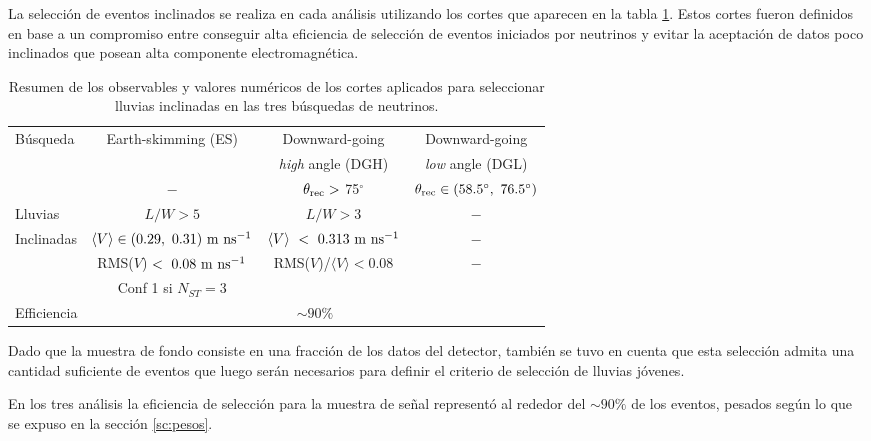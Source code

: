 		La selección de eventos inclinados se realiza en cada análisis utilizando los cortes que aparecen en la tabla \ref{tab:inclSel}.
		Estos cortes fueron definidos en base a un compromiso entre conseguir alta eficiencia de selección de eventos iniciados por neutrinos y evitar la aceptación de datos poco inclinados que posean alta componente electromagnética.
		\begin{table}[ht!]
		\begin{center}
			\renewcommand{\arraystretch}{1.4}
			\scriptsize
			\begin{tabular}{|l|c|c|c|}
			\hline
			Búsqueda & Earth-skimming (ES)           & Downward-going                        & Downward-going                       \\
					&                               & {\it high} angle (DGH)                & {\it low} angle (DGL)                \\
			\hline
						& $-$                             & $\theta_{\rm rec}>$ 75$^{\circ}$   &   $\theta_{\rm rec}\in (58.5^\circ,~76.5^{\circ})$\\
			Lluvias    & $L/W > 5$                                         & $L/W > 3$ & $-$ \\
			Inclinadas & $\langle V\rangle\in (0.29,~0.31)~{\rm m~ns^{-1}}$ & $\langle V \rangle~<~0.313~{\rm m~ns^{-1}}$ & $-$ \\
					& RMS($V$)$~<~0.08~{\rm m~ns^{-1}}$                 & RMS($V$)/$\langle V\rangle<0.08$ & $-$ \\
					& Conf 1 si $N_{ST}=3$ & & \\
			\hline
			Efficiencia & \multicolumn{3}{c|}{$\sim90\%$}\\
			\hline
			\end{tabular}
			\vskip -3mm
			\caption{Resumen de los observables y valores numéricos de los cortes aplicados para seleccionar lluvias inclinadas en las tres búsquedas de neutrinos.} 
		\end{center}

		\label{tab:inclSel}
		\end{table}
		Dado que la muestra de fondo consiste en una fracción de los datos del detector, también se tuvo en cuenta que esta selección admita una cantidad suficiente de eventos que luego serán necesarios para definir el criterio de selección de lluvias jóvenes.
		
		En los tres análisis la eficiencia de selección para la muestra de señal representó al rededor del $\sim90\%$ de los eventos, pesados según lo que se expuso en la sección \ref{sc:pesos}.
		
